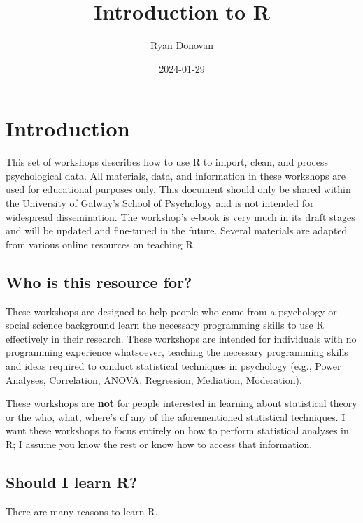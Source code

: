 \documentclass[
]{book}
\title{Introduction to R}
\author{Ryan Donovan}
\date{2024-01-29}
\begin{document}
\maketitle

{
\setcounter{tocdepth}{1}
\tableofcontents
}
\hypertarget{introduction}{%
\chapter{Introduction}\label{introduction}}

This set of workshops describes how to use R to import, clean, and process psychological data. All materials, data, and information in these workshops are used for educational purposes only. This document should only be shared within the University of Galway's School of Psychology and is not intended for widespread dissemination. The workshop's e-book is very much in its draft stages and will be updated and fine-tuned in the future. Several materials are adapted from various online resources on teaching R.

\hypertarget{who-is-this-resource-for}{%
\section{Who is this resource for?}\label{who-is-this-resource-for}}

These workshops are designed to help people who come from a psychology or social science background learn the necessary programming skills to use R effectively in their research. These workshops are intended for individuals with no programming experience whatsoever, teaching the necessary programming skills and ideas required to conduct statistical techniques in psychology (e.g., Power Analyses, Correlation, ANOVA, Regression, Mediation, Moderation).

These workshops are \textbf{not} for people interested in learning about statistical theory or the who, what, where's of any of the aforementioned statistical techniques. I want these workshops to focus entirely on how to perform statistical analyses in R; I assume you know the rest or know how to access that information.

\hypertarget{should-i-learn-r}{%
\section{Should I learn R?}\label{should-i-learn-r}}

There are many reasons to learn R.
\end{document}
